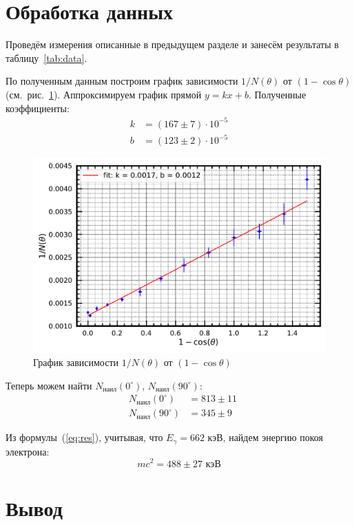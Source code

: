 \documentclass[reprint, nofootinbib, nobalancelastpage, 10pt]{revtex4-2}
\begin{document}
\section*{Обработка данных}

Проведём измерения описанные в предыдущем разделе и занесём результаты в
таблицу~\ref{tab:data}.

По полученным данным построим график зависимости $1/N(\theta)$ от $(1 - \cos \theta)$
(см.~рис.~\ref{graph:plot}). Аппроксимируем график прямой $y = kx + b$. Полученные
коэффициенты:
\begin{eqnarray*}
	k &= (167 \pm 7) \cdot 10^{-5}\\
	b &= (123 \pm 2) \cdot 10^{-5}
\end{eqnarray*}

\begin{figure}[h!]
	\includegraphics[width=\linewidth]{plot.pdf}
	\caption{График зависимости $1/N(\theta)$ от $(1 - \cos \theta)$}
	\label{graph:plot}
\end{figure}

Теперь можем найти $N_{\text{наил}}(0^\circ)$, $N_\text{наил}(90^\circ)$:
\begin{eqnarray*}
	&N_{\text{наил}}(0^\circ) &= 813 \pm 11\\
	&N_\text{наил}(90^\circ)  &= 345 \pm 9
\end{eqnarray*}

Из формулы~(\ref{eq:res}), учитывая, что $E_\gamma = 662$ кэВ, найдем энергию покоя
электрона:
\[mc^2 = 488 \pm 27 \text{ кэВ}\]


\section*{Вывод}
\end{document}
